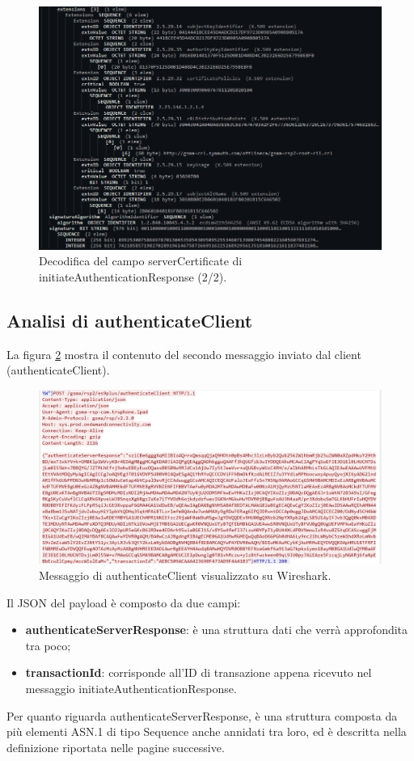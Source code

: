 \documentclass[10pt, oneside]{book}
\begin{document}
\begin{figure}
\includegraphics[width=\linewidth]{decode-serverCertificate2.png}
\caption{Decodifica del campo serverCertificate di initiateAuthenticationResponse (2/2).}
\label{fig:decode-serverCertificate2}
\end{figure}

\subsection{Analisi di authenticateClient}
La figura \ref{fig:msg3-stream-pcap} mostra il contenuto del secondo messaggio inviato dal client (authenticateClient).\\
\begin{figure}
\includegraphics[width=\linewidth]{msg3-stream-pcap.png}
\caption{Messaggio di authenticateClient visualizzato su Wireshark.}
\label{fig:msg3-stream-pcap}
\end{figure}
Il JSON del payload è composto da due campi:
\begin{itemize}
\item \textbf{authenticateServerResponse}: è una struttura dati che verrà approfondita tra poco;
\item \textbf{transactionId}: corrisponde all'ID di transazione appena ricevuto nel messaggio initiateAuthenticationResponse.
\end{itemize}
Per quanto riguarda authenticateServerResponse, è una struttura composta da più elementi ASN.1 di tipo Sequence anche annidati tra loro, ed è descritta nella definizione riportata nelle pagine successive\cite{RSP-definitions}.\\
\end{document}
